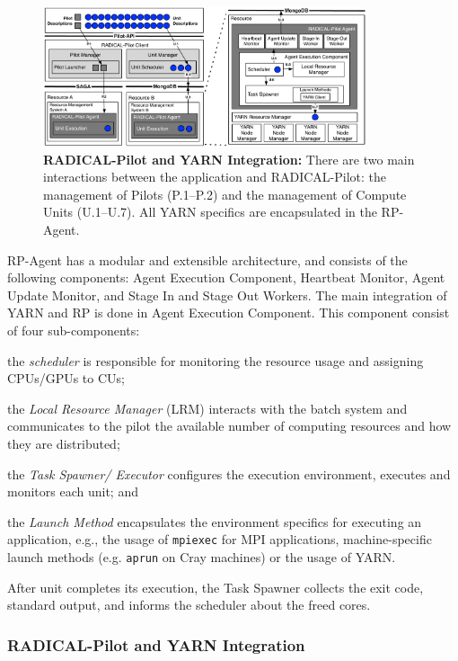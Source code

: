 \begin{figure}
    \centering
    \includegraphics[width=0.85\textwidth]{figures/data_analytics_hpc/hpc_hadoop/rp-architecture-yarn.pdf}
    \caption{\textbf{RADICAL-Pilot and YARN Integration:} There are two main
    interactions between the application and RADICAL-Pilot: the management of
    Pilots (P.1--P.2) and the management of Compute Units (U.1--U.7). All YARN
    specifics are encapsulated in the RP-Agent.}
    \label{fig:comp_rp_arch}
\end{figure}

RP-Agent has a modular and extensible architecture, and consists of
the following components: Agent Execution Component, Heartbeat Monitor, Agent
Update Monitor, and Stage In and Stage Out Workers. The main integration of YARN
and RP is done in Agent Execution Component. This component
consist of four sub-components:
\begin{inparaenum}[a)]
    \item the \textit{scheduler} is responsible for monitoring the resource
    usage and assigning CPUs/GPUs to CUs;
    \item the \textit{Local Resource Manager} (LRM) interacts with the batch
    system and communicates to the pilot the available number of computing
    resources and how they are distributed;
    \item the \textit{Task Spawner/ Executor} configures the execution
    environment, executes and monitors each unit; and
    \item the \textit{Launch Method} encapsulates the environment specifics for
    executing an application, e.g., the usage of \texttt{mpiexec} for MPI
    applications, machine-specific launch methods (e.g. \texttt{aprun} on Cray
    machines) or the usage of YARN.
\end{inparaenum}
After unit completes its execution, the Task Spawner collects the exit code,
standard output, and informs the scheduler about the freed cores.

\subsubsection*{RADICAL-Pilot and YARN Integration}
\label{sssec:rp-yarn}

